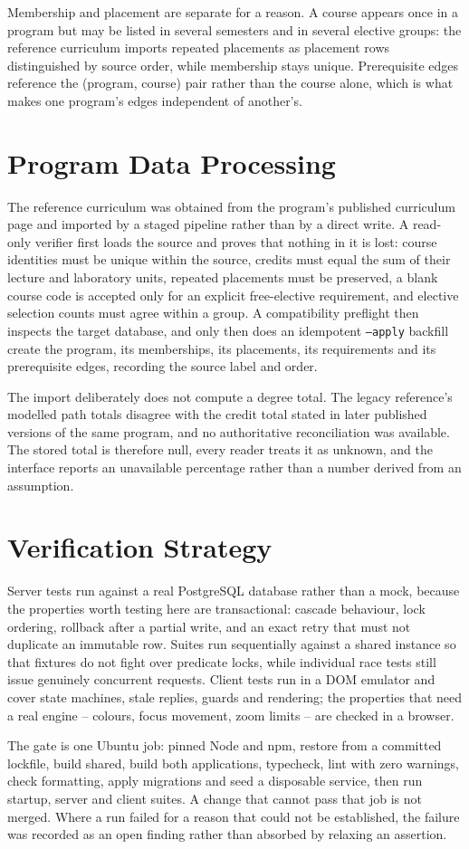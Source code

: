 Membership and placement are separate for a reason. A course appears once in a program but may be
listed in several semesters and in several elective groups: the reference curriculum imports
repeated placements as placement rows distinguished by source order, while membership stays unique.
Prerequisite edges reference the (program, course) pair rather than the course alone, which is what
makes one program's edges independent of another's.

\section{Program Data Processing}

The reference curriculum was obtained from the program's published curriculum page and imported by
a staged pipeline rather than by a direct write. A read-only verifier first loads the source and
proves that nothing in it is lost: course identities must be unique within the source, credits must
equal the sum of their lecture and laboratory units, repeated placements must be preserved, a blank
course code is accepted only for an explicit free-elective requirement, and elective selection
counts must agree within a group. A compatibility preflight then inspects the target database, and
only then does an idempotent {\tt --apply} backfill create the program, its memberships, its
placements, its requirements and its prerequisite edges, recording the source label and order.

The import deliberately does not compute a degree total. The legacy reference's modelled path
totals disagree with the credit total stated in later published versions of the same program, and
no authoritative reconciliation was available. The stored total is therefore null, every reader
treats it as unknown, and the interface reports an unavailable percentage rather than a number
derived from an assumption.

\section{Verification Strategy}

Server tests run against a real PostgreSQL database rather than a mock, because the properties
worth testing here are transactional: cascade behaviour, lock ordering, rollback after a partial
write, and an exact retry that must not duplicate an immutable row. Suites run sequentially against
a shared instance so that fixtures do not fight over predicate locks, while individual race tests
still issue genuinely concurrent requests. Client tests run in a DOM emulator and cover state
machines, stale replies, guards and rendering; the properties that need a real engine -- colours,
focus movement, zoom limits -- are checked in a browser.

The gate is one Ubuntu job: pinned Node and npm, restore from a committed lockfile, build shared,
build both applications, typecheck, lint with zero warnings, check formatting, apply migrations and
seed a disposable service, then run startup, server and client suites. A change that cannot pass
that job is not merged. Where a run failed for a reason that could not be established, the failure
was recorded as an open finding rather than absorbed by relaxing an assertion.
